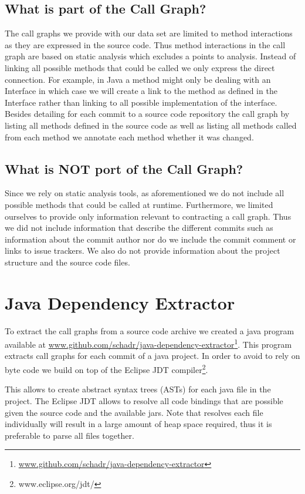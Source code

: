 \documentclass[conference]{IEEEtran}
\begin{document}
\subsection{What is part of the Call Graph?}
The call graphs we provide with our data set are limited to method interactions as they are expressed in the source code.
Thus method interactions in the call graph are based on static analysis which excludes a points to analysis.
Instead of linking all possible methods that could be called we only express the direct connection.
For example, in Java a method might only be dealing with an Interface in which case we will create a link to the method as defined in the Interface rather than linking to all possible implementation of the interface.
Besides detailing for each commit to a source code repository the call graph by listing all methods defined in the source code as well as listing all methods called from each method we annotate each method whether it was changed.

\subsection{What is NOT port of the Call Graph?}
Since we rely on static analysis tools, as aforementioned we do not include all possible methods that could be called at runtime.
Furthermore, we limited ourselves to provide only information relevant to contracting a call graph.
Thus we did not include information that describe the different commits such as information about the commit author nor do we include the commit comment or links to issue trackers.
We also do not provide information about the project structure and the source code files.



\section{Java Dependency Extractor}
\label{sec:tool}
To extract the call graphs from a source code archive we created a java program available at \url{www.github.com/schadr/java-dependency-extractor}\footnote{\url{www.github.com/schadr/java-dependency-extractor}}.
This program extracts call graphs for each commit of a java project.
In order to avoid to rely on byte code we build on top of the Eclipse JDT compiler\footnote{www.eclipse.org/jdt/}.

This allows to create abstract syntax trees (ASTs) for each java file in the project.
The Eclipse JDT allows to resolve all code bindings that are possible given the source code and the available jars.
Note that resolves each file individually will result in a large amount of heap space required, thus it is preferable to parse all files together.
\end{document}
